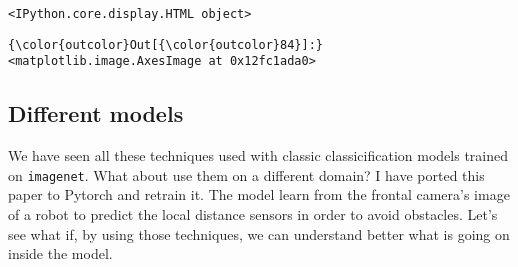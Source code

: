 \documentclass[11pt]{article}
\begin{document}
    
    
    \begin{verbatim}
<IPython.core.display.HTML object>
    \end{verbatim}

    
\begin{Verbatim}[commandchars=\\\{\}]
{\color{outcolor}Out[{\color{outcolor}84}]:} <matplotlib.image.AxesImage at 0x12fc1ada0>
\end{Verbatim}
            
    \subsection{Different models}\label{different-models}

    We have seen all these techniques used with classic classicification
models trained on \texttt{imagenet}. What about use them on a different
domain? I have ported this paper to Pytorch and retrain it. The model
learn from the frontal camera's image of a robot to predict the local
distance sensors in order to avoid obstacles. Let's see what if, by
using those techniques, we can understand better what is going on inside
the model.


    
    
    
    
\end{document}
